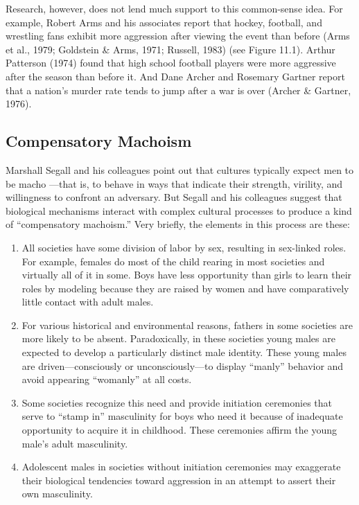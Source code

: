 \documentclass[
]{book}
\providecommand{\tightlist}{%
  \setlength{\itemsep}{0pt}\setlength{\parskip}{0pt}}
\begin{document}
Research, however, does not lend much support to this common-sense idea. For example, Robert Arms and his associates report that hockey, football, and wrestling fans exhibit more aggression after viewing the event than before (Arms et al., 1979; Goldstein \& Arms, 1971; Russell, 1983) (see Figure 11.1). Arthur Patterson (1974) found that high school football players were more aggressive after the season than before it. And Dane Archer and Rosemary Gartner report that a nation's murder rate tends to jump after a war is over (Archer \& Gartner, 1976).

\hypertarget{compensatory-machoism}{%
\subsection*{Compensatory Machoism}\label{compensatory-machoism}}

Marshall Segall and his colleagues point out that cultures typically expect men to be macho ---that is, to behave in ways that indicate their strength, virility, and willingness to confront an adversary. But Segall and his colleagues suggest that biological mechanisms interact with complex cultural processes to produce a kind of ``compensatory machoism.'' Very briefly, the elements in this process are these:

\begin{enumerate}
\def\labelenumi{\arabic{enumi}.}
\tightlist
\item
  All societies have some division of labor by sex, resulting in sex-linked roles. For example, females do most of the child rearing in most societies and virtually all of it in some. Boys have less opportunity than girls to learn their roles by modeling because they are raised by women and have comparatively little contact with adult males.\\
\item
  For various historical and environmental reasons, fathers in some societies are more likely to be absent. Paradoxically, in these societies young males are expected to develop a particularly distinct male identity. These young males are driven---consciously or unconsciously---to display ``manly'' behavior and avoid appearing ``womanly'' at all costs.\\
\item
  Some societies recognize this need and provide initiation ceremonies that serve to ``stamp in'' masculinity for boys who need it because of inadequate opportunity to acquire it in childhood. These ceremonies affirm the young male's adult masculinity.\\
\item
  Adolescent males in societies without initiation ceremonies may exaggerate their biological tendencies toward aggression in an attempt to assert their own masculinity.
\end{enumerate}
\end{document}
